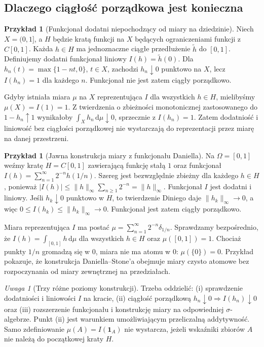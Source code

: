 \documentclass[11pt,a4paper]{article}
\numberwithin{equation}{section}
\theoremstyle{plain}
\theoremstyle{definition}
\newtheorem{przyklad}[twierdzenie]{Przykład}
\theoremstyle{remark}
\newtheorem{uwaga}[twierdzenie]{Uwaga}
\newcommand{\ind}[1]{\mathbf 1_{#1}}
\begin{document}
\subsection*{Dlaczego ciągłość porządkowa jest konieczna}
\begin{przyklad}[Funkcjonał dodatni niepochodzący od miary na dziedzinie]\label{prz:daniel-koniecznosc}
Niech $X=(0,1]$, a $H$ będzie kratą funkcji na $X$ będących ograniczeniami funkcji z $C[0,1]$. Każda $h\in H$ ma jednoznaczne ciągłe przedłużenie $\widetilde h$ do $[0,1]$. Definiujemy dodatni funkcjonał liniowy $I(h)=\widetilde h(0)$. Dla $h_n(t)=\max\{1-nt,0\}$, $t\in X$, zachodzi $h_n\downarrow0$ punktowo na $X$, lecz $I(h_n)=1$ dla każdego $n$. Funkcjonał nie jest zatem ciągły porządkowo.

Gdyby istniała miara $\mu$ na $X$ reprezentująca $I$ dla wszystkich $h\in H$, mielibyśmy $\mu(X)=I(1)=1$. Z twierdzenia o zbieżności monotonicznej zastosowanego do $1-h_n\uparrow1$ wynikałoby $\int_Xh_n\,\mathrm d\mu\downarrow0$, sprzecznie z $I(h_n)=1$. Zatem dodatniość i liniowość bez ciągłości porządkowej nie wystarczają do reprezentacji przez miarę na danej przestrzeni.
\end{przyklad}
\begin{przyklad}[Jawna konstrukcja miary z funkcjonału Daniella]\label{prz:daniell-atoms}
Na $\Omega=[0,1]$ weźmy kratę $H=C[0,1]$ zawierającą funkcję stałą $1$ oraz funkcjonał
$I(h)=\sum_{n=1}^\infty 2^{-n}h(1/n)$. Szereg jest bezwzględnie zbieżny dla każdego $h\in H$, ponieważ $|I(h)|\le\|h\|_\infty\sum_{n\ge1}2^{-n}=\|h\|_\infty$. Funkcjonał $I$ jest dodatni i liniowy. Jeśli $h_k\downarrow0$ punktowo w $H$, to twierdzenie Diniego daje $\|h_k\|_\infty\to0$, a więc $0\le I(h_k)\le\|h_k\|_\infty\to0$. Funkcjonał jest zatem ciągły porządkowo.

Miara reprezentująca $I$ ma postać $\mu=\sum_{n=1}^\infty 2^{-n}\delta_{1/n}$. Sprawdzamy bezpośrednio, że $I(h)=\int_{[0,1]}h\,\mathrm d\mu$ dla wszystkich $h\in H$ oraz $\mu([0,1])=1$. Chociaż punkty $1/n$ gromadzą się w $0$, miara nie ma atomu w $0$: $\mu(\{0\})=0$. Przykład pokazuje, że konstrukcja Daniella--Stone'a obejmuje miary czysto atomowe bez rozpoczynania od miary zewnętrznej na przedziałach.
\end{przyklad}
\begin{uwaga}[Trzy różne poziomy konstrukcji]
Trzeba oddzielić: (i) sprawdzenie dodatniości i liniowości $I$ na kracie, (ii) ciągłość porządkową $h_n\downarrow0\Rightarrow I(h_n)\downarrow0$ oraz (iii) rozszerzenie funkcjonału i konstrukcję miary na odpowiedniej $\sigma$-algebrze. Punkt (ii) jest warunkiem umożliwiającym przeliczalną addytywność. Samo zdefiniowanie $\mu(A)=I(\ind A)$ nie wystarcza, jeżeli wskaźniki zbiorów $A$ nie należą do początkowej kraty $H$.
\end{uwaga}
\end{document}
